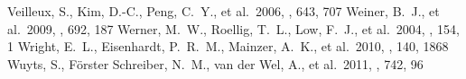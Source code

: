 \documentclass[apj]{emulateapj}
\begin{document}
\begin{thebibliography}{}
 Veilleux, S., Kim, D.-C., Peng,
  C.~Y., et al.\ 2006, \apj, 643, 707
 Weiner, B.~J., et al.\ 2009,
  \apj, 692, 187
 Werner, M.~W., Roellig, T.~L.,
  Low, F.~J., et al.\ 2004, \apjs, 154, 1
 Wright, E.~L., Eisenhardt,
  P.~R.~M., Mainzer, A.~K., et al.\ 2010, \aj, 140, 1868
 Wuyts, S., F{\"o}rster Schreiber,
  N.~M., van der Wel, A., et al.\ 2011, \apj, 742, 96
\end{thebibliography}


\clearpage










% 

\end{document}
